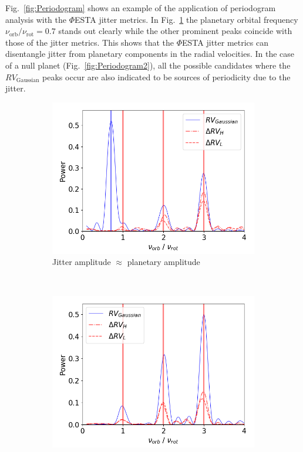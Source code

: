 Fig.~\ref{fig:Periodogram} shows an example of the application of periodogram analysis with the $\mathit{\Phi}$ESTA jitter metrics. In Fig.~\ref{fig:Periodogram1} the planetary orbital frequency $\nu_\text{orb}/\nu_\text{rot} = 0.7$ stands out clearly while the other prominent peaks coincide with those of the jitter metrics. This shows that the $\mathit{\Phi}$ESTA jitter metrics can disentangle jitter from planetary components in the radial velocities. In the case of a null planet (Fig.~\ref{fig:Periodogram2}), all the possible candidates where the $RV_\text{Gaussian}$ peaks occur are also indicated to be sources of periodicity due to the jitter. 

\begin{figure}[tbp]	
    \begin{subfigure}[b]{0.49\textwidth}
        \includegraphics[width=\textwidth]{./Figures/Methods/0-Periodogram_1.png}
        \caption{Jitter amplitude $\approx$ planetary amplitude}
        \label{fig:Periodogram1}
    \end{subfigure}
	~
    \begin{subfigure}[b]{0.49\textwidth}
        \includegraphics[width=\textwidth]{./Figures/Methods/0-Periodogram_2.png}

\end{subfigure}
\end{figure}
